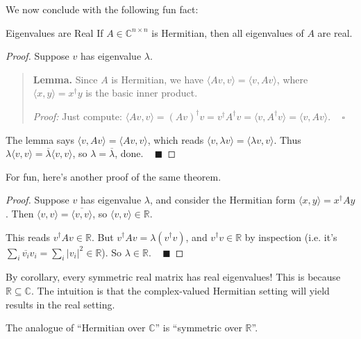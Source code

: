 We now conclude with the following fun fact:

\begin{theorem}{Eigenvalues are Real}
    If $A \in \mathbb{C}^{n \times n}$ is Hermitian, then all eigenvalues of $A$ are real.
\end{theorem}

\begin{proof}
    Suppose $v$ has eigenvalue $\lambda$.
    \begin{quote}
        \textbf{Lemma.} Since $A$ is Hermitian, we have $\langle Av, v \rangle = \langle v, Av \rangle$, where $\langle x, y \rangle = x^{\dagger}y$ is the basic inner product.

        \emph{Proof:} Just compute: $\langle Av, v \rangle = (Av)^{\dagger}v = v^{\dagger}A^{\dagger}v = \langle v, A^{\dagger}v \rangle = \langle v, Av \rangle$. ~ $\square$
    \end{quote}
    The lemma says $\langle v, Av \rangle = \langle Av, v \rangle$, which reads $\langle v, \lambda v \rangle = \langle \lambda v, v \rangle$.  Thus $\lambda \langle v, v \rangle = \overline{\lambda} \langle v, v \rangle$, so $\lambda = \overline{\lambda}$, done. ~ $\blacksquare$
\end{proof} 

For fun, here's another proof of the same theorem.

\begin{proof}
    Suppose $v$ has eigenvalue $\lambda$, and consider the Hermitian form $\langle x, y \rangle = x^{\dagger}Ay$.  Then $\langle v, v \rangle = \overline{\langle v, v \rangle}$, so $\langle v, v \rangle \in \mathbb{R}$.

    This reads $v^{\dagger}Av \in \mathbb{R}$.  But $v^{\dagger}Av = \lambda(v^{\dagger}v)$, and $v^{\dagger}v \in \mathbb{R}$ by inspection (i.e. it's $\sum_i \overline{v_i}v_i = \sum_i |v_i|^2 \in \mathbb{R}$).  So $\lambda \in \mathbb{R}$. ~ $\blacksquare$
\end{proof}

By corollary, every symmetric real matrix has real eigenvalues!  This is because $\mathbb{R} \subseteq \mathbb{C}$.  The intuition is that the complex-valued Hermitian setting will yield results in the real setting.

\begin{remark}
    The analogue of ``Hermitian over $\mathbb{C}$'' is ``symmetric over $\mathbb{R}$''.
\end{remark}

